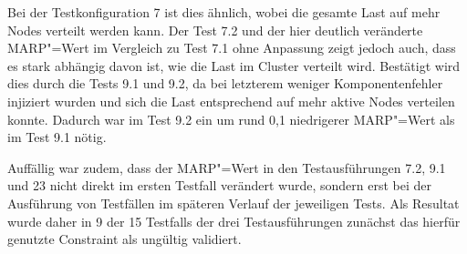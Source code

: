 Bei der \gls{Testkonfiguration} 7 ist dies ähnlich, wobei die gesamte Last auf mehr Nodes verteilt werden kann.
Der \gls{Test} 7.2 und der hier deutlich veränderte \gls{MARP}"=Wert im Vergleich zu \gls{Test} 7.1 ohne Anpassung zeigt jedoch auch, dass es stark abhängig davon ist, wie die Last im Cluster verteilt wird.
Bestätigt wird dies durch die \glspl{Test} 9.1 und 9.2, da bei letzterem weniger Komponentenfehler injiziert wurden und sich die Last entsprechend auf mehr aktive Nodes verteilen konnte.
Dadurch war im \gls{Test} 9.2 ein um rund 0,1 niedrigerer \gls{MARP}"=Wert als im \gls{Test} 9.1 nötig.

Auffällig war zudem, dass der \gls{MARP}"=Wert in den Testausführungen 7.2, 9.1 und 23 nicht direkt im ersten \gls{Testfall} verändert wurde, sondern erst bei der Ausführung von Testfällen im späteren Verlauf der jeweiligen Tests.
Als Resultat wurde daher in 9 der 15 \glspl{Testfall} der drei Testausführungen zunächst das hierfür genutzte Constraint als ungültig validiert.
